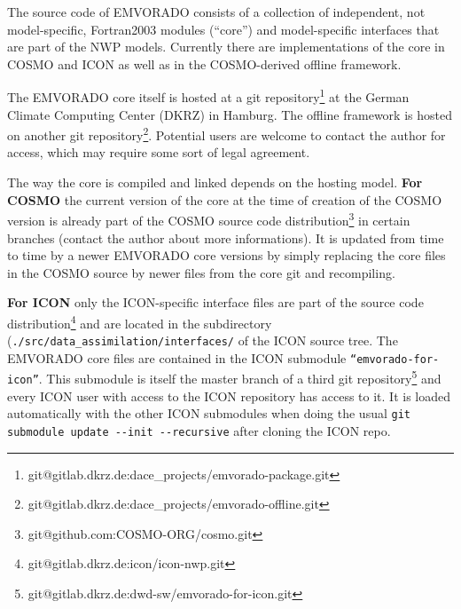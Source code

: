 \documentclass[10pt,a4paper,twoside,headinclude,footinclude,parskip=half]{scrartcl}
\newcommand{\srcform}[1]{\mbox{\texttt{#1}}\xspace}%
\begin{document}
The source code of EMVORADO consists of a collection of independent, not model-specific, Fortran2003 modules (``core'')
and model-specific interfaces that are part of the NWP models. Currently there are implementations of the core in COSMO and ICON as well as in the
COSMO-derived offline framework.

The EMVORADO core itself is hosted at a git repository\footnote{git@gitlab.dkrz.de:dace_projects/emvorado-package.git}
at the German Climate Computing Center (DKRZ) in Hamburg. The offline framework is hosted on another git repository\footnote{\label{foot:gitoff}git@gitlab.dkrz.de:dace_projects/emvorado-offline.git}.
Potential users are welcome to contact the author for access, which may require some sort of legal agreement.

The way the core is compiled and linked depends on the hosting model.
\textbf{For COSMO} the current version of the core at the time of creation of the COSMO version is already
part of the COSMO source code distribution\footnote{git@github.com:COSMO-ORG/cosmo.git} in certain branches (contact the author about more informations). It is updated from time to time by a newer EMVORADO core versions
by simply replacing the core files in the COSMO source by newer files from the core git and recompiling.

\textbf{For ICON} only the ICON-specific interface files are part of the source code distribution\footnote{git@gitlab.dkrz.de:icon/icon-nwp.git} and are located in
the subdirectory (\verb|./src/data_assimilation/interfaces/| of the ICON source tree.
The EMVORADO core files are contained in the ICON submodule \srcform{``emvorado-for-icon''}. This submodule is itself
the master branch of a third git repository\footnote{git@gitlab.dkrz.de:dwd-sw/emvorado-for-icon.git} and every ICON user with access to
the ICON repository has access to it. It is loaded automatically with the other ICON submodules when doing the
usual \verb|git submodule update --init --recursive| after cloning the ICON repo.
\end{document}
